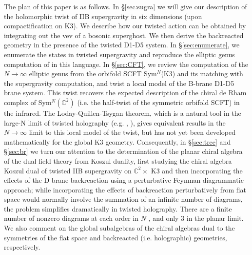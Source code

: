 \documentclass[11pt]{amsart}
\begin{document}
The plan of this paper is as follows. In \S \ref{sec:sugra} we will give our description of the holomorphic twist of IIB supergravity in six dimensions (upon compactification on K3). We describe how our twisted action can be obtained by integrating out the vev of a bosonic superghost. We then derive the backreacted geometry in the presence of the twisted D1-D5 system. In \S \ref{sec:enumerate}, we enumerate the states in twisted supergravity and reproduce the elliptic genus computation of \cite{deBoerSUGRA, deBoerEG} in this language. In \S \ref{sec:CFT}, we review the computation of the $N \rightarrow \infty$ elliptic genus from the orbifold SCFT Sym$^N$(K3) and its matching with the supergravity computation, and twist a local model of the B-brane D1-D5 brane system. This twist recovers the expected description of the chiral de Rham complex of Sym$^N(\mathbb{C}^2)$ (i.e. the half-twist of the symmetric orbifold SCFT) in the infrared. The Loday-Quillen-Tsygan theorem, which is a natural tool in the large-N limit of twisted holography (e.g. \cite{Zeng:2023lox}, \cite{ginot2022large}), gives equivalent results in the $N \rightarrow \infty$ limit to this local model of the twist, but has not yet been developed mathematically for the global K3 geometry. Consequently, in \S \ref{sec:tree} and \S \ref{sec:br} we turn our attention to the determination of the planar chiral algebra of the dual field theory from Koszul duality, first studying the chiral algebra Koszul dual of twisted IIB supergravity on $\mathbb{C}^2 \times$ K3 and then incorporating the effects of the D-brane backreaction using a perturbative Feynman diagrammatic approach; while incorporating the effects of backreaction perturbatively from flat space would normally involve the summation of an infinite number of diagrams, the problem simplifies dramatically in twisted holography. There are a finite number of nonzero diagrams at each order in $N$ \cite{CP}, and only 3 in the planar limit. We also comment on the global subalgebras of the chiral algebras dual to the symmetries of the flat space and backreacted (i.e. holographic) geometries, respectively.

















\end{document}
